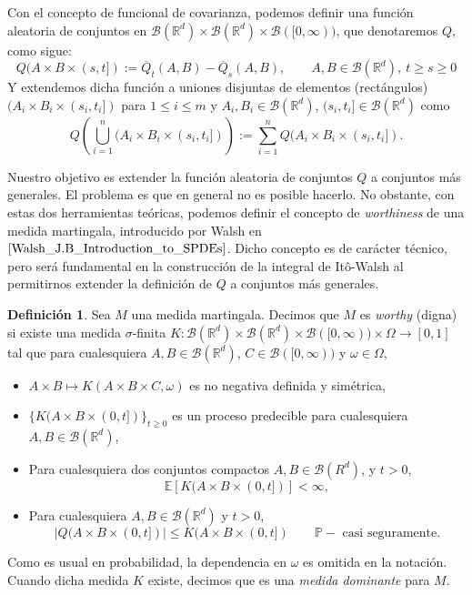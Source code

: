 \documentclass[letterpaper,twoside,12pt]{book}
\newcommand{\R}{\mathbb{R}}
\newcommand{\B}{\mathcal{B}}
\newcommand{\E}{\mathbb{E}}
\renewcommand{\P}{\mathbb{P}}
\newcommand{\1}{\mathds{1}}
\newcommand{\abs}[1]{\left\lvert #1 \right\rvert}
\renewcommand{\to}{\rightarrow}
\theoremstyle{definition}
\newtheorem{dfn}{Definición}
\theoremstyle{definition}
\theoremstyle{definition}
\theoremstyle{definition}
\theoremstyle{definition}
\theoremstyle{definition}
\theoremstyle{definition}
\begin{document}
Con el concepto de funcional de covarianza, podemos definir una función aleatoria de conjuntos en $\B(\R^{d})\times \B(\R^{d})\times \B([0,\infty))$, que denotaremos $Q$, como sigue:
\[
    Q(A\times B\times(s,t]):=\overline{Q}_t(A,B)-\overline{Q}_s(A,B), \qquad A,B\in \B(\R^{d}), \ t\geq s\geq 0
    \]
Y extendemos dicha función a uniones disjuntas de elementos (rectángulos)
$(A_i\times B_i\times(s_i,t_i])$ para $1\leq i \leq m$ y $A_i,B_i\in \B(\R^{d})$, $(s_i,t_i]\in \B(\R^{d})$ como 
\[
Q \left(\bigcup_{i=1}^{n}(A_i\times B_i\times(s_i,t_i])\right):=\sum_{i=1}^{n}Q(A_i\times B_i\times (s_i,t_i]).
\]
   
Nuestro objetivo es extender la función aleatoria de conjuntos $Q$ a conjuntos más generales. El problema es que en general no es posible hacerlo. No obstante, con estas dos herramientas teóricas, podemos definir el concepto de \textit{worthiness} de una medida martingala, introducido por Walsh en $\cite{Walsh_J.B_Introduction_to_SPDEs}$.
 Dicho concepto es de carácter técnico, pero será fundamental en la construcción de la integral de Itô-Walsh al permitirnos extender la definición de $Q$ a conjuntos más generales.


\begin{dfn} 
 Sea $M$ una medida martingala. Decimos que $M$ es \textit{worthy} (digna) si existe una medida $\sigma$-finita $K:\B(\R^{d})\times \B(\R^{d})\times \B([0,\infty))\times \Omega \to [0,1]$ tal que para cualesquiera $A,B\in \B(\R^{d})$, $C\in \B([0,\infty))$ y $\omega \in \Omega$, 
 \begin{itemize}
    \item $A\times B\mapsto K(A\times B \times C,\omega)$ es no negativa definida y simétrica,
    \item $\{K(A\times B \times (0,t])\}_{t\geq0}$ es un proceso predecible para cualesquiera $A, B \in \B(\R^{d})$,
    \item Para cualesquiera dos conjuntos compactos $A,B \in \B(R^{d})$, y $t>0$, 
    \[
    \E\left[K(A\times B \times (0,t])\right]<\infty,    
    \]
    \item Para cualesquiera $A,B\in \B(\R^{d})$ y $t>0$,
    \[
    \abs{Q(A\times B \times (0,t])}\leq K(A\times B \times (0,t]) \qquad \P-\text{ casi seguramente.}   
    \]
 \end{itemize}
Como es usual en probabilidad, la dependencia en $\omega$ es omitida en la notación. Cuando dicha medida $K$ existe, decimos que es una \textit{medida dominante} para $M$.
\end{dfn}
\end{document}
